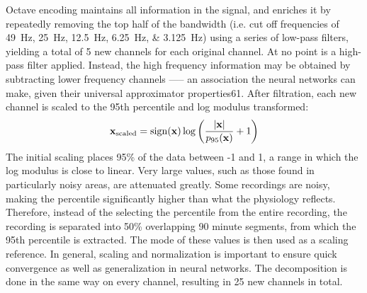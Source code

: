 Octave encoding maintains all information in the signal, and enriches it by repeatedly removing the top half of the bandwidth (i.e. cut off frequencies of \SIlist{49;25;12.5;6.25;3.125}{\hertz}) using a series of low-pass filters, yielding a total of 5 new channels for each original channel. At no point is a high-pass filter applied. Instead, the high frequency information may be obtained by subtracting lower frequency channels —– an association the neural networks can make, given their universal approximator properties61. After filtration, each new channel is scaled to the 95th percentile and log modulus transformed:
\begin{equation}
    \mathbf{x}_{\mathrm{scaled}} = \operatorname{sign} \! \left( \mathbf{x} \right) \log{\left( \frac{|\mathbf{x}|}{p_{95}(\mathbf{x})} + 1 \right)}
\end{equation}
The initial scaling places 95\% of the data between -1 and 1, a range in which the log modulus is close to linear. Very large values, such as those found in particularly noisy areas, are attenuated greatly. Some recordings are noisy, making the  percentile significantly higher than what the physiology reflects. Therefore, instead of the selecting the  percentile from the entire recording, the recording is separated into 50\% overlapping 90 minute segments, from which the 95th percentile is extracted. The mode of these values is then used as a scaling reference. In general, scaling and normalization is important to ensure quick convergence as well as generalization in neural networks. The decomposition is done in the same way on every channel, resulting in 25 new channels in total.

